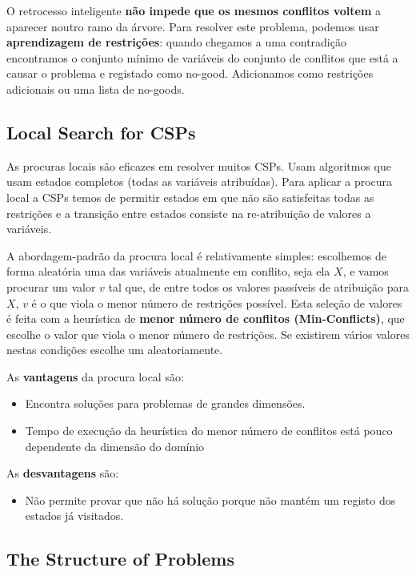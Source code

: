 \documentclass[11pt]{article}
\begin{document}
O retrocesso inteligente \textbf{não impede que os mesmos conflitos voltem} a aparecer noutro ramo da árvore. Para resolver este problema, podemos usar \textbf{aprendizagem de restrições}: quando chegamos a uma contradição encontramos o conjunto mínimo de variáveis do conjunto de conflitos que está a causar o problema e registado como no-good. Adicionamos como restrições adicionais ou uma lista de no-goods.

\subsection{Local Search for CSPs}

As procuras locais são eficazes em resolver muitos CSPs. Usam algoritmos que usam estados completos (todas as variáveis atribuídas). Para aplicar a procura local a CSPs temos de permitir estados em que não são satisfeitas todas as restrições e a transição entre estados consiste na re-atribuição de valores a variáveis.\vspace{4pt}

A abordagem-padrão da procura local é relativamente simples: escolhemos de forma aleatória uma das variáveis atualmente em conflito, seja ela $X$, e vamos procurar um valor $v$ tal que, de entre todos os valores passíveis de atribuição para $X$, $v$ é o que viola o menor número de restrições possível. Esta seleção de valores é feita com a heurística de \textbf{menor número de conflitos (Min-Conflicts)}, que escolhe o valor que viola o menor número de restrições. Se existirem vários valores nestas condições escolhe um aleatoriamente.\vspace{4pt}

As \textbf{vantagens} da procura local são:
\begin{itemize}[topsep=4pt,itemsep=0pt]
    \item Encontra soluções para problemas de grandes dimensões.
    \item Tempo de execução da heurística do menor número de conflitos está pouco dependente da dimensão do domínio
\end{itemize}
As \textbf{desvantagens} são:
\begin{itemize}[topsep=4pt,itemsep=0pt]
    \item Não permite provar que não há solução porque não mantém um registo dos estados já visitados.
\end{itemize}

\subsection{The Structure of Problems}
\end{document}
